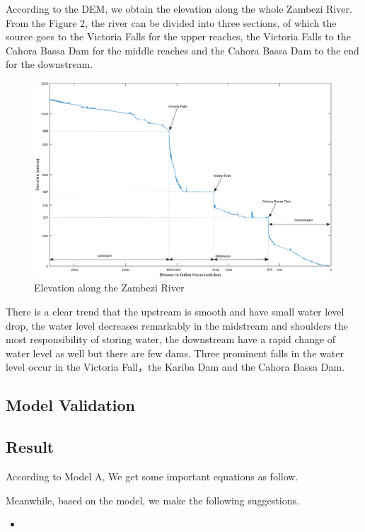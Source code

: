 \documentclass{mcmthesis}
\begin{document}
According to the DEM, we obtain the elevation along the whole Zambezi River. From the Figure 2, the river can be divided into three sections, of which the source goes to the Victoria Falls for the upper reaches, the Victoria Falls to the Cahora Bassa Dam for the middle reaches and the Cahora Bassa Dam to the end for the downstream.

\begin{figure}[h]
\small
\centering
\includegraphics[width=16cm]{./figures/dis_alti_v3.png}
\caption{Elevation along the Zambezi River} \label{fig:Fig2}
\end{figure}

There is a clear trend that the upstream is smooth and have small water level drop, the water level decreases remarkably in the midstream and shoulders the most responsibility of storing water, the downstream have a rapid change of water level as well but there are few dams. Three prominent falls in the water level occur in the Victoria Fall，the Kariba Dam and the Cahora Bassa Dam.

\subsection{Model Validation}

\subsection{Result}
\indent \indent According to Model A, We get some important equations as follow.

Meanwhile, based on the model, we make the following suggestions.
\begin{itemize}
  \item 
\end{itemize}
\end{document}
